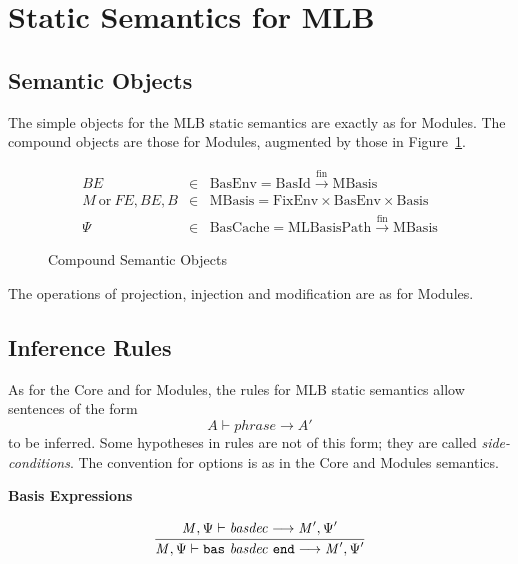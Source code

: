 \documentclass[draft]{article}
\renewcommand{\mit}[1]{\mathit{#1}}
\newcommand{\mrm}[1]{\mathrm{#1}}
\newcommand{\mtt}[1]{\mathtt{#1}}
\newcommand{\infrule}[2]{{\frac{\displaystyle\strut{#1}}{\displaystyle\strut{#2}}}}
\newcommand{\judge}[2]{\infrule{#1}{#2}}
\begin{document}
\section{Static Semantics for MLB}
%
\subsection{Semantic Objects}
The simple objects for the MLB static semantics are exactly as for
Modules.  The compound objects are those for Modules, augmented by
those in Figure~\ref{fig:mlb:SS:CompoundObjects}.
\begin{figure}[h]
\begin{displaymath}
\begin{array}{rcl}
\mit{BE} & \in & \mrm{BasEnv} = \mrm{BasId} \xrightarrow{\mrm{fin}} \mrm{MBasis} \\
\mit{M} ~\mrm{or}~ \mit{FE},\mit{BE},\mit{B} & \in & 
\mrm{MBasis} = \mrm{FixEnv} \times \mrm{BasEnv} \times \mrm{Basis} \\
\Psi & \in & \mrm{BasCache} = \mrm{MLBasisPath} \xrightarrow{\mrm{fin}} \mrm{MBasis} 
\end{array}
\end{displaymath}
\caption{Compound Semantic Objects}\label{fig:mlb:SS:CompoundObjects}
\end{figure}
The operations of projection, injection and modification are as for
Modules.
%
\subsection{Inference Rules}
As for the Core and for Modules, the rules for MLB static semantics
allow sentences of the form
\begin{displaymath}
A \vdash \mit{phrase} \longrightarrow A'
\end{displaymath}
to be inferred.  Some hypotheses in rules are not of this form; they
are called \emph{side-conditions}.  The convention for options is as
in the Core and Modules semantics.

\vspace{2\parsep}
{\large\noindent
\textbf{Basis Expressions} \hfill
\fbox{$\mit{M}, \Psi \vdash \mit{basexp} \longrightarrow \mit{M}', \Psi'$}
}\nopagebreak

\begin{equation}
\judge{
\mit{M}, \Psi \vdash \mit{basdec} \longrightarrow \mit{M}', \Psi'
}{
\mit{M}, \Psi \vdash \mtt{bas}~ \mit{basdec} ~\mtt{end} \longrightarrow \mit{M}', \Psi'
}
\end{equation}
\end{document}
